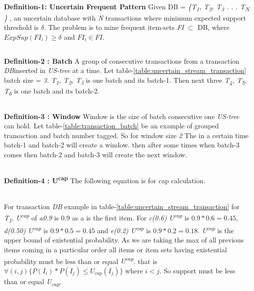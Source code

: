%
\subsection*{}
\textbf{Definition-1: Uncertain Frequent Pattern} Given DB = \emph{\{T\textsubscript{1}, T\textsubscript{2}, T\textsubscript{3} . . . T\textsubscript{N} \}} , an uncertain database with \emph{N} transactions where minimum expected support threshold is $\delta$. The problem is to mine frequent item-sets \emph{FI} $\subset$ DB, where $ExpSup(FI_i) \geq \delta $ and $FI_i \in FI$.
\subsection*{}
\textbf{Definition-2 : Batch} A group of consecutive transactions from a transaction \emph{DB}inserted in \emph{US-tree} at a time. Let table-\ref{table:uncertain_stream_transaction} batch size = \emph{3}. \emph{T\textsubscript{1}, T\textsubscript{2}, T\textsubscript{3}} is one batch and its batch-1. Then next three \emph{T\textsubscript{4}, T\textsubscript{5}, T\textsubscript{6}} is one batch and its batch-2.
\subsection*{}
\textbf{Definition-3 : Window} Window is the size of batch consecutive one \emph{US-tree} can hold. Let table-\ref{table:transaction_batch} be an example of grouped transaction and batch number tagged. So for window size \emph{2} The in a certain time batch-1 and batch-2 will create a window. then after some times when batch-3 comes then batch-2 and batch-3 will create the next window.
\subsection*{}
\textbf{Definition-4 : U\textsuperscript{cap}} The following equation is for cap calculation.

\\
For transaction \emph{DB} example in table-\ref{table:uncertain_stream_transaction} for \emph{T\textsubscript{1}}, \emph{U\textsuperscript{cap}} of \emph{a{0.9}} is $0.9$ as a is the first item. For \emph{c(0.6)} \emph{U\textsuperscript{cap}} is $0.9*0.6=0.45$, \emph{d(0.50)} \emph{U\textsuperscript{cap}} is $0.9*0.5=0.45$ and \emph{e(0.2)} \emph{U\textsuperscript{cap}} is $0.9*0.2=0.18$. \emph{U\textsuperscript{cap}} is the upper bound of existential probability. As we are taking the max of all previous items coming in a particular order all items or item sets having existential probability must be less than or equal \emph{U\textsuperscript{cap}}. that is $\forall(i,j)\{ P(I_i)*P(I_j)\leq U_{cap}(I_j)\}$ where $i < j$. So support must be less than or equal \emph{U\textsubscript{cap}}.
%
%